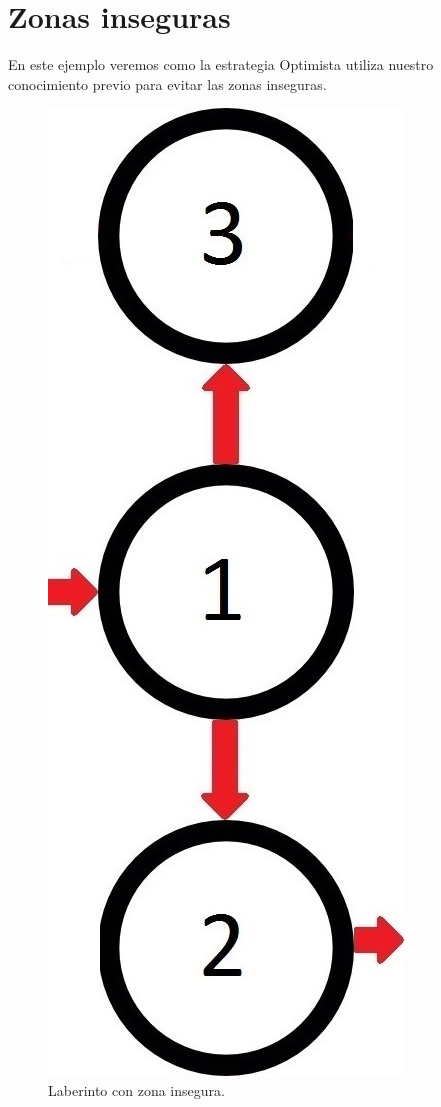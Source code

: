 \clearpage

\section{Zonas inseguras}

En este ejemplo veremos como la estrategia Optimista utiliza nuestro conocimiento previo para evitar las zonas inseguras.

\begin{figure}[H]
	\centering
		\includegraphics[scale=0.2]{Imagenes/Laberintos/unsafe.jpg}
	\caption{Laberinto con zona insegura.}
	\label{fig:unsafe}
\end{figure}

